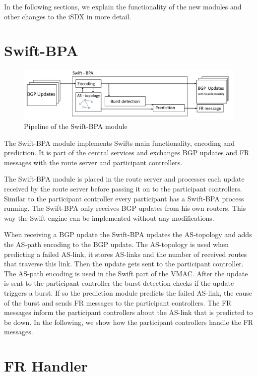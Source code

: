 In the following sections, we explain the functionality of the new modules and other changes to the iSDX in more detail.

\section{\label{chapter4:Swift-BPA}Swift-BPA}

\begin{figure}[h]
\center
\includegraphics[scale = 0.5]{Figures/design_swift_bpa_cropped.pdf}
\caption{Pipeline of the Swift-BPA module}
\end{figure}

The Swift-BPA module implements Swifts main functionality, encoding and prediction. It is part of the central services and exchanges BGP updates and FR messages with the route server and participant controllers.

The Swift-BPA module is placed in the route server and processes each update received by the route server before passing it on to the participant controllers. 
Similar to the participant controller every participant has a Swift-BPA process running. The Swift-BPA only receives BGP updates from his own routers. This way the Swift engine can be implemented without any modifications.

When receiving a BGP update the Swift-BPA updates the AS-topology and adds the AS-path encoding to the BGP update. The AS-topology is used when predicting a failed AS-link, it stores AS-links and the number of received routes that traverse this link. Then the update gets sent to the participant controller. The AS-path encoding is used in the Swift part of the VMAC. 
After the update is sent to the participant controller the burst detection checks if the update triggers a burst. If so the prediction module predicts the failed AS-link, the cause of the burst and sends FR messages to the participant controllers. 
The FR messages inform the participant controllers about the AS-link that is predicted to be down. In the following, we show how the participant controllers handle the FR messages.


\section{\label{chapter4:FR-handler}FR Handler}

